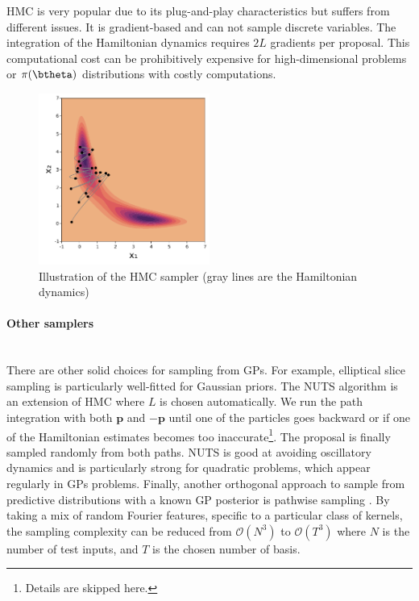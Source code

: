 \ac{HMC} is very popular due to its plug-and-play characteristics but suffers from different issues.
It is gradient-based and can not sample discrete variables.
The integration of the Hamiltonian dynamics requires $2L$ gradients per proposal.
This computational cost can be prohibitively expensive for high-dimensional problems or $\pi(\btheta)$ distributions with costly computations.

\begin{figure}[H]
    \centering
\includegraphics[width=0.5\textwidth]{./chapters/2_background/figures/hmc_sampling.pdf}
\caption{Illustration of the HMC sampler (gray lines are the Hamiltonian dynamics)}
\label{fig:hmc}
\end{figure}


\paragraph{Other samplers}\mbox{}\\
There are other solid choices for sampling from \ac{GPs}.
For example, elliptical slice sampling \citet{murray2010elliptical} is particularly well-fitted for Gaussian priors.
The \ac{NUTS} algorithm \cite{hoffman2014no} is an extension of \ac{HMC} where $L$ is chosen automatically.
We run the path integration with both $\boldsymbol{p}$ and $-\boldsymbol{p}$ until one of the particles goes backward or if one of the Hamiltonian estimates becomes too inaccurate\footnote{Details are skipped here.}.
The proposal is finally sampled randomly from both paths.
\ac{NUTS} is good at avoiding oscillatory dynamics and is particularly strong for quadratic problems, which appear regularly in \ac{GPs} problems.
Finally, another orthogonal approach to sample from predictive distributions with a known \ac{GP} posterior is pathwise sampling \cite{wilson2021pathwise}.
By taking a mix of random Fourier features, specific to a particular class of kernels, the sampling complexity can be reduced from $\mathcal{O}(N^3)$ to $\mathcal{O}(T^3)$ where $N$ is the number of test inputs, and $T$ is the chosen number of basis.

